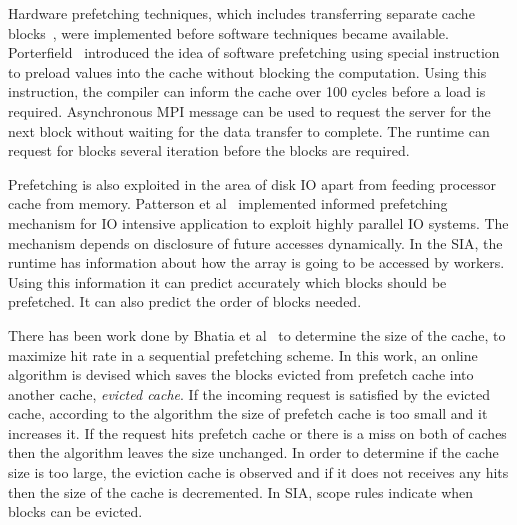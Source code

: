Hardware prefetching techniques, which includes transferring separate
cache blocks~\cite{Smith1978}, were implemented before software techniques became
available. Porterfield~\cite{Porterfield1989} introduced the idea of software prefetching
using special instruction to preload values into the cache without blocking the
computation. Using this instruction, the compiler can inform the cache over 100
cycles before a load is required. Asynchronous MPI message can be used to request
the server for the next block without waiting for the data transfer to complete. The runtime can
request for blocks several iteration before the blocks are required.

Prefetching is also exploited in the area of disk IO apart from feeding processor cache
from memory. Patterson et al~\cite{Patterson1994} implemented informed prefetching
mechanism for IO intensive application to exploit highly parallel IO systems. The
mechanism depends on disclosure of future accesses dynamically. In the SIA, the runtime
has information about how the array is going to be accessed by workers. Using this
information it can predict accurately which blocks should be prefetched. It can
also predict the order of blocks needed.


There has been work done by Bhatia et al~\cite{Bhatia2010} to determine the size of
the cache, to maximize hit rate in a sequential prefetching scheme. In this work, an
online algorithm is devised which saves the blocks evicted from prefetch cache
into another cache, \textit{evicted cache}. If the incoming request is satisfied
by the evicted cache, according to the algorithm the size of prefetch cache is too
small and it increases it. If the request hits prefetch cache or there is a miss
on both of caches then the algorithm leaves the size unchanged. In order to determine if
the cache size is too large, the eviction cache is observed and if it does not
receives any hits then the size of the cache is decremented. In SIA, scope rules
indicate when blocks can be evicted.

